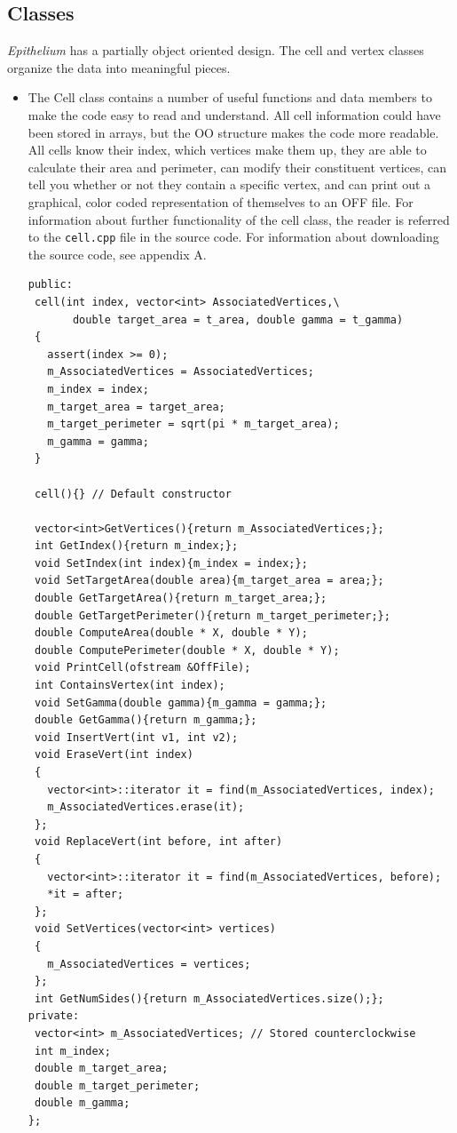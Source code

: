 \subsection{Classes}
\label{sec:class}
\emph{Epithelium} has a partially object oriented design. The cell and vertex classes organize the data into meaningful pieces.
\begin{itemize}
\item The {\color{red} Cell} class contains a number of useful functions and data members to make the code easy to read and understand. All cell information could have been stored in arrays, but the OO structure makes the code more readable. All cells know their index, which vertices make them up, they are able to calculate their area and perimeter, can modify their constituent vertices, can tell you whether or not they contain a specific vertex, and can print out a graphical, color coded representation of themselves to an OFF file. For information about further functionality of the cell class, the reader is referred to the \texttt{cell.cpp} file in the source code. For information about downloading the source code, see appendix A.
\begin{lstlisting}
public:
 cell(int index, vector<int> AssociatedVertices,\
       double target_area = t_area, double gamma = t_gamma)
 {	
   assert(index >= 0);
   m_AssociatedVertices = AssociatedVertices;
   m_index = index;
   m_target_area = target_area;
   m_target_perimeter = sqrt(pi * m_target_area);
   m_gamma = gamma; 
 }
	
 cell(){} // Default constructor
	
 vector<int>GetVertices(){return m_AssociatedVertices;};
 int GetIndex(){return m_index;};
 void SetIndex(int index){m_index = index;};
 void SetTargetArea(double area){m_target_area = area;};
 double GetTargetArea(){return m_target_area;};
 double GetTargetPerimeter(){return m_target_perimeter;};
 double ComputeArea(double * X, double * Y);
 double ComputePerimeter(double * X, double * Y);
 void PrintCell(ofstream &OffFile);
 int ContainsVertex(int index);
 void SetGamma(double gamma){m_gamma = gamma;};
 double GetGamma(){return m_gamma;};
 void InsertVert(int v1, int v2);
 void EraseVert(int index)
 {
   vector<int>::iterator it = find(m_AssociatedVertices, index); 
   m_AssociatedVertices.erase(it);
 };
 void ReplaceVert(int before, int after)
 {
   vector<int>::iterator it = find(m_AssociatedVertices, before); 
   *it = after;
 };
 void SetVertices(vector<int> vertices)
 {
   m_AssociatedVertices = vertices;
 };
 int GetNumSides(){return m_AssociatedVertices.size();};
private:
 vector<int> m_AssociatedVertices; // Stored counterclockwise
 int m_index;	
 double m_target_area;
 double m_target_perimeter;
 double m_gamma;
};


\end{lstlisting}
\end{itemize}
